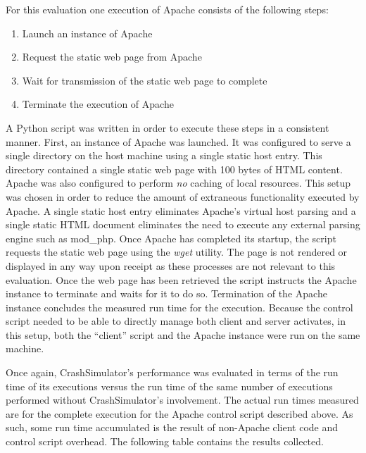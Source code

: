                 For this evaluation one execution of Apache consists of the following steps:

                \begin{enumerate}
                    \item{} Launch an instance of Apache
                    \item{} Request the static web page from Apache
                    \item{} Wait for transmission of the static web page to complete
                    \item{} Terminate the execution of Apache
                \end{enumerate}

                A Python script was written in order to execute these steps in a consistent manner. First, an instance
                of Apache was launched. It was configured to serve a single directory on the host machine using a single
                static host entry. This directory contained a single static web page with 100 bytes of HTML content.
                Apache was also configured to perform \emph{no} caching of local resources. This setup was chosen in
                order to reduce the amount of extraneous functionality executed by Apache. A single static host entry
                eliminates Apache's virtual host parsing and a single static HTML document eliminates the need to
                execute any external parsing engine such as mod\_php. Once Apache has completed its startup, the script
                requests the static web page using the \emph{wget} utility. The page is not rendered or displayed in any
                way upon receipt as these processes are not relevant to this evaluation.  Once the web page has been
                retrieved the script instructs the Apache instance to terminate and waits for it to do so.  Termination
                of the Apache instance concludes the measured run time for the execution.  Because the control script
                needed to be able to directly manage both client and server activates, in this setup, both the
                ``client'' script and the Apache instance were run on the same machine.

                Once again, CrashSimulator's performance was evaluated in terms of the run time of its executions versus
                the run time of the same number of executions performed without CrashSimulator's involvement. The actual
                run times measured are for the complete execution for the Apache control script described above. As
                such, some run time accumulated is the result of non-Apache client code and control script overhead. The
                following table contains the results collected.

